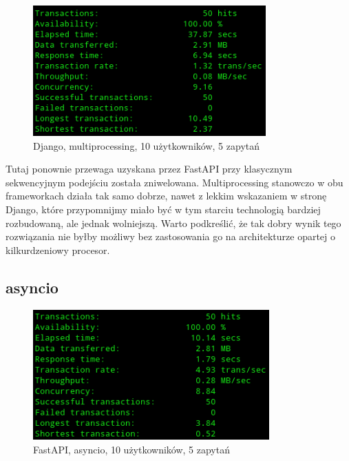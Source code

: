 \begin{figure}[H]
    \includegraphics[height=50mm]{zdjecia/10_req_process_django}
    \centering
    \caption{Django, multiprocessing, 10 użytkowników, 5 zapytań}
\end{figure}

Tutaj ponownie przewaga uzyskana przez FastAPI przy klasycznym sekwencyjnym podejściu została zniwelowana. Multiprocessing stanowczo w obu frameworkach działa tak samo dobrze, nawet z lekkim wskazaniem w stronę Django, które przypomnijmy miało być w tym starciu technologią bardziej rozbudowaną, ale jednak wolniejszą. Warto podkreślić, że tak dobry wynik tego rozwiązania nie byłby możliwy bez zastosowania go na architekturze opartej o kilkurdzeniowy procesor.

\subsection{asyncio}
\begin{figure}[H]
    \includegraphics[height=50mm]{zdjecia/10_req_asyncio_fast}
    \centering
    \caption{FastAPI, asyncio, 10 użytkowników, 5 zapytań}
\end{figure}

